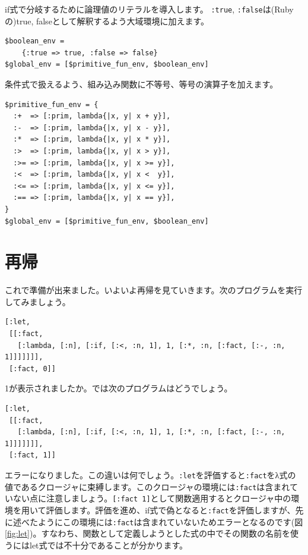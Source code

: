 if式で分岐するために論理値のリテラルを導入します。
{\tt :true}, {\tt :false}は(Rubyの)true, falseとして解釈するよう大域環境に加えます。

\begin{lstlisting}
$boolean_env = 
    {:true => true, :false => false}
$global_env = [$primitive_fun_env, $boolean_env]
\end{lstlisting}

条件式で扱えるよう、組み込み関数に不等号、等号の演算子を加えます。

\begin{lstlisting}
$primitive_fun_env = {
  :+  => [:prim, lambda{|x, y| x + y}],
  :-  => [:prim, lambda{|x, y| x - y}],
  :*  => [:prim, lambda{|x, y| x * y}],
  :>  => [:prim, lambda{|x, y| x > y}],
  :>= => [:prim, lambda{|x, y| x >= y}],
  :<  => [:prim, lambda{|x, y| x <  y}],
  :<= => [:prim, lambda{|x, y| x <= y}],
  :== => [:prim, lambda{|x, y| x == y}],
}
$global_env = [$primitive_fun_env, $boolean_env]
\end{lstlisting}

\section{再帰}

これで準備が出来ました。いよいよ再帰を見ていきます。次のプログラムを実行してみましょう。

\begin{lstlisting}
[:let, 
 [[:fact,
   [:lambda, [:n], [:if, [:<, :n, 1], 1, [:*, :n, [:fact, [:-, :n, 1]]]]]]], 
 [:fact, 0]]
\end{lstlisting}

1が表示されましたか。では次のプログラムはどうでしょう。

\begin{lstlisting}
[:let, 
 [[:fact,
   [:lambda, [:n], [:if, [:<, :n, 1], 1, [:*, :n, [:fact, [:-, :n, 1]]]]]]], 
 [:fact, 1]]
\end{lstlisting}

エラーになりました。この違いは何でしょう。{\tt :let}を評価すると{\tt :fact}をλ式の値であるクロージャに束縛します。このクロージャの環境には{\tt :fact}は含まれていない点に注意しましょう。{\tt [:fact 1]}として関数適用するとクロージャ中の環境を用いて評価します。評価を進め、if式で偽となると{\tt :fact}を評価しますが、先に述べたようにこの環境には{\tt :fact}は含まれていないためエラーとなるのです(図\ref{fig:let})。すなわち、関数として定義しようとした式の中でその関数の名前を使うにはlet式では不十分であることが分かります。

